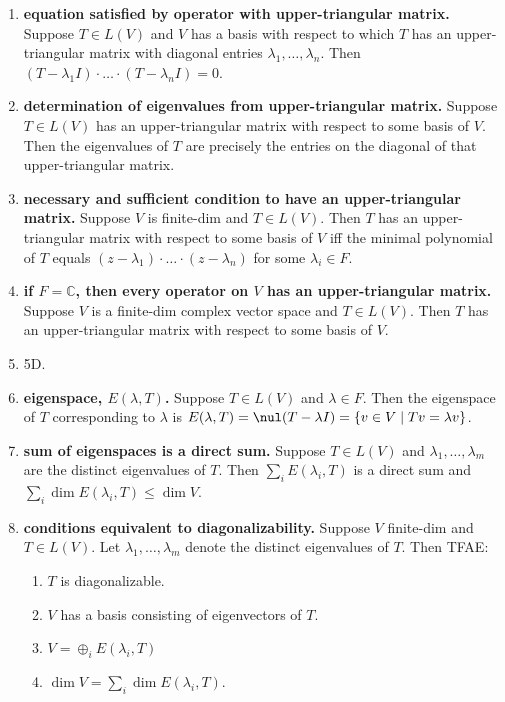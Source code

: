 \begin{enumerate}
\begin{enumerate}
	\end{enumerate}
	\item \textbf{equation satisfied by operator with upper-triangular matrix. } Suppose $T \in L(V)$ and $V$ has a basis with respect to which $T$ has an upper-triangular matrix with diagonal entries $\lambda_1,\dots,\lambda_n$. Then $(T-\lambda_1 I) \cdot \dots \cdot (T-\lambda_n I) = 0$. 
	\item \textbf{determination of eigenvalues from upper-triangular matrix. } Suppose $T \in L(V)$ has an upper-triangular matrix with respect to some basis of $V$. Then the eigenvalues of $T$ are precisely the entries on the diagonal of that upper-triangular matrix. 
	\item \textbf{necessary and sufficient condition to have an upper-triangular matrix. } Suppose $V$ is finite-dim and $T \in L(V)$. Then $T$ has an upper-triangular matrix with respect to some basis of $V$ iff the minimal polynomial of $T$ equals $(z-\lambda_1) \cdot \dots \cdot (z-\lambda_n)$ for some $\lambda_i \in F$. 
	\item \textbf{if $F = \mathbb{C}$, then every operator on $V$ has an upper-triangular matrix. } Suppose $V$ is a finite-dim complex vector space and $T \in L(V)$. Then $T$ has an upper-triangular matrix with respect to some basis of $V$. 
	\item 5D. 
	\item \textbf{eigenspace, $E(\lambda, T)$. } Suppose $T \in L(V)$ and $\lambda \in F$. Then the eigenspace of $T$ corresponding to $\lambda$ is $E(\lambda,T) = \nul (T - \lambda I) = \{v \in V \mid Tv = \lambda v\}$. 
	\item \textbf{sum of eigenspaces is a direct sum. } Suppose $T \in L(V)$ and $\lambda_1,\dots,\lambda_m$ are the distinct eigenvalues of $T$. Then $\sum_i E(\lambda_i,T)$ is a direct sum and $\sum_i \dim E(\lambda_i, T) \leq \dim V$. 
	\item \textbf{conditions equivalent to diagonalizability. } Suppose $V$ finite-dim and $T \in L(V)$. Let $\lambda_1,\dots,\lambda_m$ denote the distinct eigenvalues of $T$. Then TFAE: 
	\begin{enumerate}
		\item $T$ is diagonalizable. 
		\item $V$ has a basis consisting of eigenvectors of $T$. 
		\item $V = \oplus_i E(\lambda_i, T)$
		\item $\dim V = \sum_i \dim E(\lambda_i,T)$. 
	\end{enumerate}

\end{enumerate}
